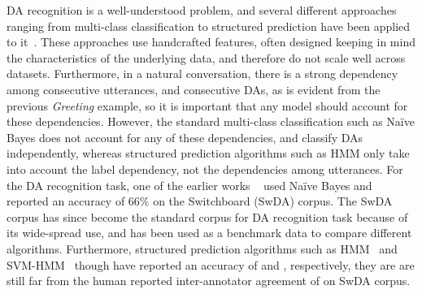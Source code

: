 \documentclass[letterpaper]{article} \usepackage{aaai18}
\begin{document}
DA recognition is a well-understood problem, and several different approaches ranging from multi-class classification to structured prediction have been applied to it~\cite{Grau2004,Ang2005,Stolcke2006,Lendvai2007,Tavafi2013}. These approaches use handcrafted features, often designed keeping in mind the characteristics of the underlying data, and therefore do not scale well across datasets. Furthermore, in a natural conversation, there is a strong dependency among consecutive utterances, and consecutive DAs, as is evident from the previous \textit{Greeting} example, so it is important that any model should account for these dependencies. However, the standard multi-class classification such as Na\"ive Bayes does not account for any of these dependencies, and classify DAs independently, whereas structured prediction algorithms such as HMM only take into account the label dependency, not the dependencies among utterances. For the DA recognition task, one of the earlier works ~\cite{Grau2004} used Na\"ive Bayes and reported an accuracy of 66\% on the Switchboard (SwDA) corpus. The SwDA corpus has since become the standard corpus for DA recognition task because of its wide-spread use, and has been used as a benchmark data to compare different algorithms. Furthermore, structured prediction algorithms such as HMM~\cite{Stolcke2006} and SVM-HMM~\cite{Lendvai2007,Tavafi2013} though have reported an accuracy of  and , respectively, they are are still far from the human reported inter-annotator agreement of  on SwDA corpus.
\end{document}
